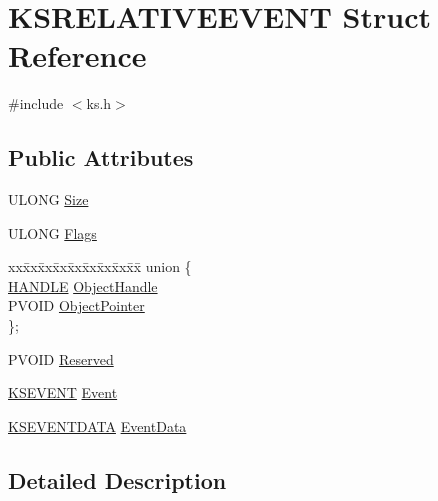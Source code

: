 \hypertarget{struct_k_s_r_e_l_a_t_i_v_e_e_v_e_n_t}{}\section{K\+S\+R\+E\+L\+A\+T\+I\+V\+E\+E\+V\+E\+NT Struct Reference}
\label{struct_k_s_r_e_l_a_t_i_v_e_e_v_e_n_t}


{\ttfamily \#include $<$ks.\+h$>$}

\subsection*{Public Attributes}
\begin{DoxyCompactItemize}
\item 
U\+L\+O\+NG \hyperlink{struct_k_s_r_e_l_a_t_i_v_e_e_v_e_n_t_a4f2b373b6251ad6f8fac52676c94a430}{Size}
\item 
U\+L\+O\+NG \hyperlink{struct_k_s_r_e_l_a_t_i_v_e_e_v_e_n_t_ad139d9b8be7a60c347ba6ca839c220fa}{Flags}
\item 
\begin{tabbing}
xx\=xx\=xx\=xx\=xx\=xx\=xx\=xx\=xx\=\kill
union \{\\
\>\hyperlink{_sound_touch_d_l_l_8h_aa8c0374618b33785ccb02f74bcfebc46}{HANDLE} \hyperlink{struct_k_s_r_e_l_a_t_i_v_e_e_v_e_n_t_ad9a2b661ef1c4b4cf80d98e87514e881}{ObjectHandle}\\
\>PVOID \hyperlink{struct_k_s_r_e_l_a_t_i_v_e_e_v_e_n_t_a8460e7d6dccd09980ddc5389cfbcf697}{ObjectPointer}\\
\}; \\

\end{tabbing}\item 
P\+V\+O\+ID \hyperlink{struct_k_s_r_e_l_a_t_i_v_e_e_v_e_n_t_a86e6d25d595e9871a1a4895760ea4276}{Reserved}
\item 
\hyperlink{ks_8h_a4ce55f771904d86bc71007c0e5876285}{K\+S\+E\+V\+E\+NT} \hyperlink{struct_k_s_r_e_l_a_t_i_v_e_e_v_e_n_t_a832cb6010891364ea88339705304aeab}{Event}
\item 
\hyperlink{struct_k_s_e_v_e_n_t_d_a_t_a}{K\+S\+E\+V\+E\+N\+T\+D\+A\+TA} \hyperlink{struct_k_s_r_e_l_a_t_i_v_e_e_v_e_n_t_aad34baa168c003862cc7ad87f41520a4}{Event\+Data}
\end{DoxyCompactItemize}


\subsection{Detailed Description}



